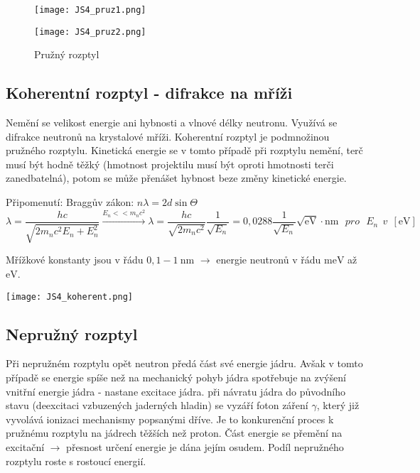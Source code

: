 \documentclass[../../main.tex]{subfiles}
\begin{document}
\begin{figure}[h!]
	\begin{minipage}[c]{0.5\linewidth}
		\texttt{[image: JS4\_pruz1.png]}
	\end{minipage}
	\hfill
	\begin{minipage}[c]{0.5\linewidth}
		\texttt{[image: JS4\_pruz2.png]}
	\end{minipage}
	\caption{Pružný rozptyl}
\end{figure}

\subsection{Koherentní rozptyl - difrakce na mříži}

Nemění se velikost energie ani hybnosti a vlnové délky neutronu. Využívá se difrakce neutronů na krystalové mříži. Koherentní rozptyl je podmnožinou pružného rozptylu. Kinetická energie se v tomto případě při rozptylu nemění, terč musí být hodně těžký (hmotnost projektilu musí být oproti hmotnosti terči zanedbatelná), potom se může přenášet hybnost beze změny kinetické energie. 

Připomenutí: Braggův zákon: $n \lambda = 2d \sin \varTheta$
\begin{equation}
\lambda = \dfrac{hc}{\sqrt{2m_n c^2 E_n + E_{n}^2}} \xrightarrow{E_n << m_n c^2} \lambda = \dfrac{hc}{\sqrt{2 m_n c^2}} \dfrac{1}{\sqrt{E_n}} = 0,0288 \dfrac{1}{\sqrt{E_n}} \sqrt{\mathrm{eV}} \cdotp \mathrm{nm} ~~~\textit{pro} ~~~ E_n ~~v~~ [\mathrm{eV}]
\end{equation}

Mřížkové konstanty jsou v řádu $0,1 - 1 ~\mathrm{nm}$ $\rightarrow$ energie neutronů v řádu $\mathrm{meV}$ až $\mathrm{eV}$. 
	
\begin{center}
	\texttt{[image: JS4\_koherent.png]}
\end{center}	

\subsection{Nepružný rozptyl}

Při nepružném rozptylu opět neutron předá část své energie jádru. Avšak v tomto případě se energie spíše než na mechanický pohyb jádra spotřebuje na zvýšení vnitřní energie jádra - nastane excitace jádra. při návratu jádra do původního stavu (deexcitaci vzbuzených jaderných hladin) se vyzáří foton záření $\gamma$, který již vyvolává ionizaci mechanismy popsanými dříve. Je to konkurenční proces k pružnému rozptylu na jádrech těžších než proton. Část energie se přemění na excitační $\rightarrow$ přesnost určení energie je dána jejím osudem. Podíl nepružného rozptylu roste s rostoucí energií.     
\end{document}
